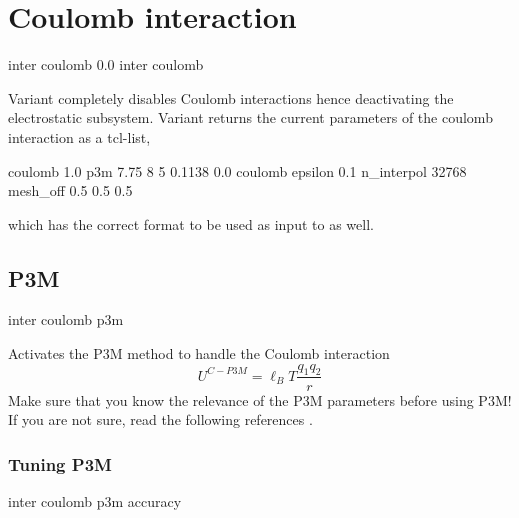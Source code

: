 \section{Coulomb interaction}
\label{sec:inter-electrostatics}

\begin{essyntax}
   inter coulomb 0.0
   inter coulomb
\end{essyntax}

Variant  completely disables Coulomb interactions hence
deactivating the electrostatic subsystem.  Variant  returns
the current parameters of the coulomb interaction as a tcl-list, \eg
\begin{tclcode}
{coulomb 1.0 p3m 7.75 8 5 0.1138 0.0} {coulomb epsilon 0.1
n_interpol 32768 mesh_off 0.5 0.5 0.5}
\end{tclcode}
which has the correct format to be used as input to  as
well.

\subsection{P3M}

\begin{essyntax}
  inter coulomb p3m    
\end{essyntax}

Activates the P3M method to handle the Coulomb
interaction
\begin{equation}
  U^{C-P3M} = \ell_B T \frac{q_1 q_2}{r}
\end{equation}
Make sure that you know the relevance of the P3M parameters before
using P3M! If you are not sure, read the following references \cite{ewald21,hockney88,kolafa92,deserno98,deserno98a,deserno00,deserno00a}.

\subsubsection{Tuning P3M}
\begin{essyntax}
  inter coulomb p3m 
  accuracy \\
\end{essyntax}


